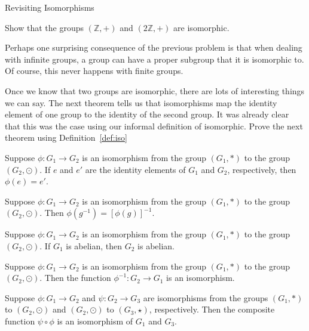 \begin{section}{Revisiting Isomorphisms}
\begin{exercise}
\end{exercise}

\begin{problem}
Show that the groups $(\mathbb{Z},+)$ and $(2\mathbb{Z},+)$ are isomorphic.
\end{problem}

Perhaps one surprising consequence of the previous problem is that when dealing with infinite groups, a group can have a proper subgroup that it is isomorphic to.  Of course, this never happens with finite groups.

Once we know that two groups are isomorphic, there are lots of interesting things we can say.  The next theorem tells us that isomorphisms map the identity element of one group to the identity of the second group.  It was already clear that this was the case using our informal definition of isomorphic.  Prove the next theorem using Definition~\ref{def:iso}

\begin{theorem}\label{thm:hom_id}
Suppose $\phi:G_1\to G_2$ is an isomorphism from the group $(G_1,*)$ to the group $(G_2,\odot)$.  If $e$ and $e'$ are the identity elements of $G_1$ and $G_2$, respectively, then $\phi(e)=e'$.
\end{theorem}

\begin{theorem}\label{thm:hom_inverse}
Suppose $\phi:G_1\to G_2$ is an isomorphism from the group $(G_1,*)$ to the group $(G_2,\odot)$.   Then $\phi(g^{-1})=[\phi(g)]^{-1}$.
\end{theorem}

\begin{theorem}
Suppose $\phi:G_1\to G_2$ is an isomorphism from the group $(G_1,*)$ to the group $(G_2,\odot)$. If $G_1$ is abelian, then $G_2$ is abelian.
\end{theorem}

\begin{theorem}
Suppose $\phi:G_1\to G_2$ is an isomorphism from the group $(G_1,*)$ to the group $(G_2,\odot)$. Then the function $\phi^{-1}:G_2\to G_1$ is an isomorphism.
\end{theorem}

\begin{theorem}
Suppose $\phi:G_1\to G_2$ and $\psi:G_2\to G_3$ are isomorphisms from the groups $(G_1,*)$ to $(G_2,\odot)$ and $(G_2,\odot)$ to $(G_3,\star)$, respectively. Then the composite function $\psi\circ\phi$ is an isomorphism of $G_1$ and $G_3$.
\end{theorem}


\end{section}
